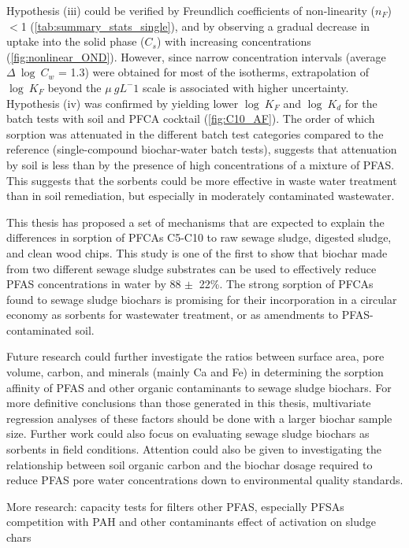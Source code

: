 Hypothesis (iii) could be verified by Freundlich coefficients of non-linearity ($n_F$) $<$1 (\cref{tab:summary_stats_single}), and by observing a gradual decrease in uptake into the solid phase ($C_s$) with increasing concentrations (\cref{fig:nonlinear_OND}). However, since narrow concentration intervals (average $\Delta~\log~C_w$ = 1.3) were obtained for most of the isotherms, extrapolation of $\log~K_F$ beyond the $\mu~g L^-1$ scale is associated with higher uncertainty. Hypothesis (iv) was confirmed by yielding lower $\log~K_F$ and $\log~K_d$ for the batch tests with soil and PFCA cocktail (\cref{fig:C10_AF}). The order of which sorption was attenuated in the different batch test categories compared to the reference (single-compound biochar-water batch tests), suggests that attenuation by soil is less than by the presence of high concentrations of a mixture of PFAS. This suggests that the sorbents could be more effective in waste water treatment than in soil remediation, but especially in moderately contaminated wastewater. 

This thesis has proposed a set of mechanisms that are expected to explain the differences in sorption of PFCAs C5-C10 to raw sewage sludge, digested sludge, and clean wood chips. This study is one of the first to show that biochar made from two different sewage sludge substrates can be used to effectively reduce PFAS concentrations in water by 88 $\pm~$ 22\%. The strong sorption of PFCAs found to sewage sludge biochars is promising for their incorporation in a circular economy as sorbents for wastewater treatment, or as amendments to PFAS-contaminated soil. 

Future research could further investigate the ratios between surface area, pore volume, carbon, and minerals (mainly Ca and Fe) in determining the sorption affinity of PFAS and other organic contaminants to sewage sludge biochars. For more definitive conclusions than those generated in this thesis, multivariate regression analyses of these factors should be done with a larger biochar sample size. Further work could also focus on evaluating sewage sludge biochars as sorbents in field conditions. Attention could also be given to investigating the relationship between soil organic carbon and the biochar dosage required to reduce PFAS pore water concentrations down to environmental quality standards. 

More research:
capacity tests for filters
other PFAS, especially PFSAs
competition with PAH and other contaminants
effect of activation on sludge chars

